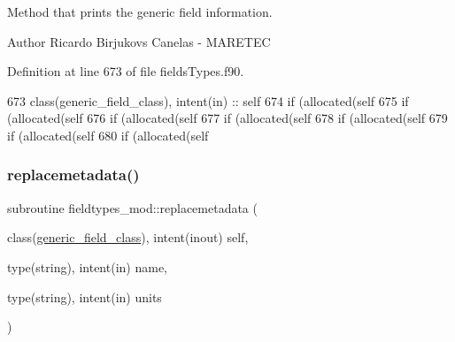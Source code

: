 Method that prints the generic field information. 

\begin{DoxyAuthor}{Author}
Ricardo Birjukovs Canelas -\/ M\+A\+R\+E\+T\+EC 
\end{DoxyAuthor}


Definition at line 673 of file fields\+Types.\+f90.


\begin{DoxyCode}
673     \textcolor{keywordtype}{class}(generic\_field\_class), \textcolor{keywordtype}{intent(in)} :: self
674     \textcolor{keywordflow}{if} (\textcolor{keyword}{allocated}(self%
675     \textcolor{keywordflow}{if} (\textcolor{keyword}{allocated}(self%
676     \textcolor{keywordflow}{if} (\textcolor{keyword}{allocated}(self%
677     \textcolor{keywordflow}{if} (\textcolor{keyword}{allocated}(self%
678     \textcolor{keywordflow}{if} (\textcolor{keyword}{allocated}(self%
679     \textcolor{keywordflow}{if} (\textcolor{keyword}{allocated}(self%
680     \textcolor{keywordflow}{if} (\textcolor{keyword}{allocated}(self%
\end{DoxyCode}
\mbox{\label{namespacefieldtypes__mod_ad8f3bf57dafb3eac18e5a3198e36047c}} 
\subsubsection{\texorpdfstring{replacemetadata()}{replacemetadata()}}
{\footnotesize\ttfamily subroutine fieldtypes\+\_\+mod\+::replacemetadata (\begin{DoxyParamCaption}\item[{class(\mbox{\hyperlink{structfieldtypes__mod_1_1generic__field__class}{generic\+\_\+field\+\_\+class}}), intent(inout)}]{self,  }\item[{type(string), intent(in)}]{name,  }\item[{type(string), intent(in)}]{units }\end{DoxyParamCaption})\hspace{0.3cm}{\ttfamily [private]}}



